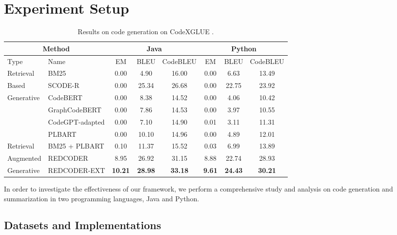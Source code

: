 \documentclass[11pt]{article}
\newcommand{\tool}{{REDCODER}\xspace}
\newcommand{\toolext}{{REDCODER-EXT}\xspace}
\newcommand{\coder}{SCODE-R\xspace}
\begin{document}
 \section{Experiment Setup}
\label{sec:exp_setup}




\begin{table*}[h]
\centering
\begin{tabular}{l|l|c c c|c c c}
\hline
\multicolumn{2}{c|}{Method} & \multicolumn{3}{c|}{Java}& \multicolumn{3}{c}{Python}\\
\hline
Type & Name & EM & BLEU & CodeBLEU & EM & BLEU & CodeBLEU \\
\hline
Retrieval & BM25 &  0.00 & 4.90 & 16.00 & 0.00 & 6.63 & 13.49 \\
Based & \coder  & 0.00 & 25.34  & 26.68 & 0.00 & {22.75} &  23.92  \\
\hline
\multirow{4}{*}{Generative} & CodeBERT & 0.00 & 8.38 & 14.52 & 0.00 & 4.06 & 10.42\\
& GraphCodeBERT & 0.00 & 7.86 & 14.53 & 0.00 & 3.97 & 10.55\\
& CodeGPT-adapted & 0.00 & 7.10 & 14.90 & 0.01 & 3.11 & 11.31 \\ 
& PLBART &  0.00 & 10.10 & 14.96 & 0.00 & 4.89  & 12.01  \\
\hline
Retrieval & BM25 + PLBART  & 0.10 & 11.37 & 15.52 & 0.03 & 6.99   & 13.89 \\
Augmented & \tool   & {8.95} & { 26.92}  & {31.15} & { 8.88} & { 22.74}  & {28.93}   \\
Generative & \toolext & {\bf 10.21} & {\bf 28.98}   & {\bf 33.18} & {\bf 9.61} & {\bf 24.43} &  {\bf 30.21} \\
\hline 
\end{tabular}
\caption{
Results on code generation on CodeXGLUE \cite{CodeXGLUE}.
}
\label{table:csnet_gen}
\vspace{-2mm}
\end{table*}


 


In order to investigate the effectiveness of our framework, we perform a comprehensive study and analysis on code generation and summarization in two programming languages, Java and Python.  


\subsection{Datasets and Implementations}
\end{document}
